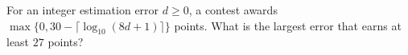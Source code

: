 For an integer estimation error $d\ge0$, a contest awards $\max\{0,30-\lceil\log_{10}(8d+1)\rceil\}$ points. What is the largest error that earns at least $27$ points?
